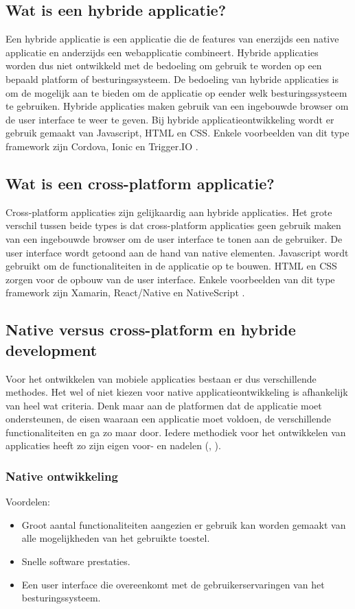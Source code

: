 \subsection{Wat is een hybride applicatie?}
Een hybride applicatie is een applicatie die de features van enerzijds een native applicatie en anderzijds een webapplicatie combineert. Hybride applicaties worden dus niet ontwikkeld met de bedoeling om gebruik te worden op een bepaald platform of besturingssysteem. De bedoeling van hybride applicaties is om de mogelijk aan te bieden om de applicatie op eender welk besturingssysteem te gebruiken. Hybride applicaties maken gebruik van een ingebouwde browser om de user interface te weer te geven. Bij hybride applicatieontwikkeling wordt er gebruik gemaakt van Javascript, HTML en CSS. Enkele voorbeelden van dit type framework zijn Cordova, Ionic en Trigger.IO \autocite{MeaningHybridApp}.

\subsection{Wat is een cross-platform applicatie?}
Cross-platform applicaties zijn gelijkaardig aan hybride applicaties. Het grote verschil tussen beide types is dat cross-platform applicaties geen gebruik maken van een ingebouwde browser om de user interface te tonen aan de gebruiker. De user interface wordt getoond aan de hand van native elementen. Javascript wordt gebruikt om de functionaliteiten in de applicatie op te bouwen. HTML en CSS zorgen voor de opbouw van de user interface. Enkele voorbeelden van dit type framework zijn Xamarin, React/Native en NativeScript \autocite{NativeVsCross2}.

\subsection{Native versus cross-platform en hybride development}
\label{sec:nativeversuscross}
Voor het ontwikkelen van mobiele applicaties bestaan er dus verschillende methodes. Het wel of niet kiezen voor native applicatieontwikkeling is afhankelijk van heel wat criteria. Denk maar aan de platformen dat de applicatie moet ondersteunen, de eisen waaraan een applicatie moet voldoen, de verschillende functionaliteiten en ga zo maar door. Iedere methodiek voor het ontwikkelen van applicaties heeft zo zijn eigen voor- en nadelen (\textcite{NativeVsCross2}, \textcite{NativeVsCross3}).

\subsubsection{Native ontwikkeling}
Voordelen:
\begin{itemize}
	\item Groot aantal functionaliteiten aangezien er gebruik kan worden gemaakt van alle mogelijkheden van het gebruikte toestel.
	\item Snelle software prestaties.
	\item Een user interface die overeenkomt met de gebruikerservaringen van het besturingssysteem.
\end{itemize}

